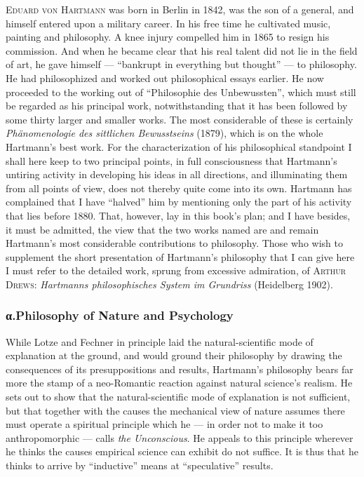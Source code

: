 \documentclass[12pt,a4paper]{book}
\newcommand{\opage}[1]{\marginnote{\footnotesize\textit{[#1]}}}
\begin{document}
\textsc{Eduard von Hartmann} was born in Berlin in 1842, was the son of a
general, and himself entered upon a military career. In his free time he
cultivated music, painting and philosophy. A knee injury compelled him in 1865 to
resign his commission. And when he became clear that his real talent did not lie
in the field of \opage{536}art, he gave himself --- ``bankrupt in everything but thought''
--- to philosophy. He had philosophized and worked out philosophical essays
earlier. He now proceeded to the working out of ``Philosophie des Unbewussten'',
which must still be regarded as his principal work, notwithstanding that it has
been followed by some thirty larger and smaller works. The most considerable of
these is certainly \textit{Phänomenologie des sittlichen Bewusstseins} (1879),
which is on the whole Hartmann's best work. For the characterization of his
philosophical standpoint I shall here keep to two principal points, in full
consciousness that Hartmann's untiring activity in developing his ideas in all
directions, and illuminating them from all points of view, does not thereby quite
come into its own. Hartmann has complained that I have ``halved'' him by
mentioning only the part of his activity that lies before 1880. That, however,
lay in this book's plan; and I have besides, it must be admitted, the view that
the two works named are and remain Hartmann's most considerable contributions to
philosophy. Those who wish to supplement the short presentation of Hartmann's
philosophy that I can give here I must refer to the detailed work, sprung from
excessive admiration, of \textsc{Arthur Drews}: \textit{Hartmanns philosophisches
System im Grundriss} (Heidelberg 1902).

\subsubsection*{α.\quad Philosophy of Nature and Psychology}

While Lotze and Fechner in principle laid the natural-scientific mode of
explanation at the ground, and would ground their philosophy by drawing the
consequences of its presuppositions and results, Hartmann's philosophy bears far
more the stamp of a neo-Romantic reaction against natural science's realism. He
sets out to show that the natural-scientific mode of explanation is not
sufficient, but that together with the causes the mechanical view of nature
assumes there must operate a spiritual principle which he --- in order not to
make it too anthropomorphic --- calls \emph{the Unconscious}. He appeals to this
principle wherever he thinks the causes empirical \opage{537}science can exhibit do not
suffice. It is thus that he thinks to arrive by ``inductive'' means at
``speculative'' results.
\end{document}

